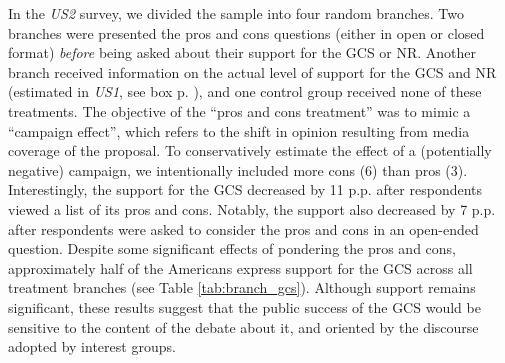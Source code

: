 \begin{bibunit}
In the \textit{US2} survey, we divided the sample into four random branches. Two branches were presented the pros and cons questions (either in open or closed format) \textit{before} being asked about their support for the GCS or NR. Another branch received information on the actual level of support for the GCS and NR (estimated in \textit{US1}, see box p. \pageref{subsec:second_order_beliefs}), %
and one control group received none of these treatments. %
The objective of the ``pros and cons treatment'' was to mimic a ``campaign effect'', which refers to the shift in opinion resulting from media coverage of the proposal.\citep{anderson_can_2023} To conservatively estimate the effect of a (potentially negative) campaign, we intentionally included more cons (6) than pros (3). Interestingly, the support for the GCS decreased by 11 p.p. after respondents viewed a list of its pros and cons. %
Notably, the support also decreased by 7 p.p. after respondents were asked to consider the pros and cons in an open-ended question. Despite some significant effects of pondering the pros and cons, approximately half of the Americans express support for the GCS across all treatment branches (see Table \ref{tab:branch_gcs}). Although support remains significant, %
these results suggest that the public success of the GCS would be sensitive to the content of the debate about it, and oriented by the discourse adopted by interest groups. %







\end{bibunit}

